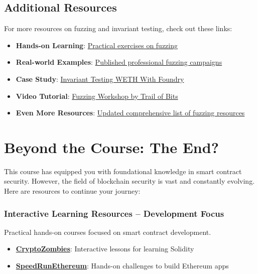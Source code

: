 \documentclass[12pt]{article}
\begin{document}
\subsection*{Additional Resources}
\medskip
\noindent
For more resources on fuzzing and invariant testing, check out these links:
\begin{itemize}
    \item \textbf{Hands-on Learning}: \href{https://github.com/crytic/building-secure-contracts/tree/master/program-analysis/echidna/exercises}{Practical exercises on fuzzing}
    \item \textbf{Real-world Examples}: \href{https://github.com/perimetersec/public-fuzzing-campaigns-list}{Published professional fuzzing campaigns}
    \item \textbf{Case Study}: \href{https://mirror.xyz/horsefacts.eth/Jex2YVaO65dda6zEyfM_-DXlXhOWCAoSpOx5PLocYgw}{Invariant Testing WETH With Foundry}
    \item \textbf{Video Tutorial}: \href{https://www.youtube.com/playlist?list=PLciHOL_J7Iwqdja9UH4ZzE8dP1IxtsBXI}{Fuzzing Workshop by Trail of Bits}
    \item \textbf{Even More Resources}: \href{https://github.com/perimetersec/evm-fuzzing-resources?tab=readme-ov-file#evm-fuzzing-resources}{Updated comprehensive list of fuzzing resources}
\end{itemize}

\section{Beyond the Course: The End?}

This course has equipped you with foundational knowledge in smart contract
security. However, the field of blockchain security is vast and constantly
evolving. Here are resources to continue your journey:

\subsubsection*{Interactive Learning Resources -- Development Focus}

Practical hands-on courses focused on smart contract development.

\begin{itemize}
    \item \textbf{\href{https://cryptozombies.io/}{CryptoZombies}}: Interactive lessons for learning Solidity
    \item \textbf{\href{https://speedrunethereum.com/}{SpeedRunEthereum}}: Hands-on challenges to build Ethereum apps
\end{itemize}
\end{document}
